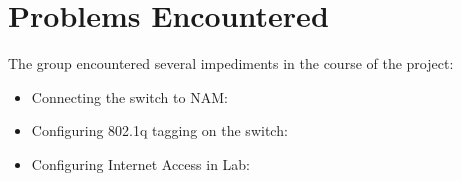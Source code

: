 \section{Problems Encountered}

The group encountered several impediments in the course of the project:

\begin{itemize}

\item {Connecting the switch to NAM}:
\item {Configuring 802.1q tagging on the switch}:
\item {Configuring Internet Access in Lab}:

\end{itemize}